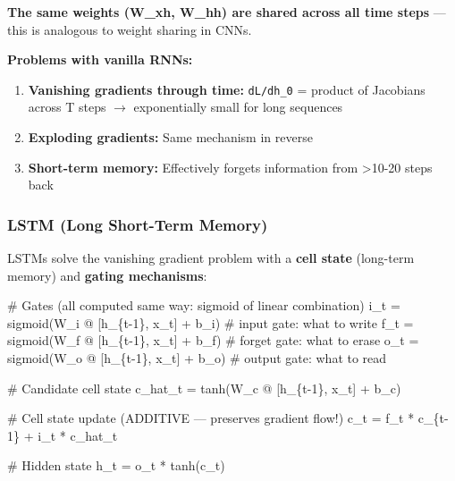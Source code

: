 \documentclass[11pt]{article}
\providecommand{\tightlist}{\setlength{\itemsep}{1pt}\setlength{\parskip}{0pt}}
\newenvironment{Shaded}{\begin{snugshade}}{\end{snugshade}}
\newcommand{\CommentTok}[1]{\textcolor[rgb]{0.48,0.49,0.49}{#1}}
\newcommand{\DecValTok}[1]{\textcolor[rgb]{0.96,0.45,0.00}{#1}}
\newcommand{\NormalTok}[1]{\textcolor[rgb]{0.81,0.81,0.76}{#1}}
\newcommand{\OperatorTok}[1]{\textcolor[rgb]{0.81,0.81,0.76}{#1}}
\begin{document}
\textbf{The same weights (W\_xh, W\_hh) are shared across all time steps} --- this is analogous to weight sharing in CNNs.

\textbf{Problems with vanilla RNNs:}

\begin{enumerate}
\def\labelenumi{\arabic{enumi}.}
\tightlist
\item
  \textbf{Vanishing gradients through time:} \texttt{dL/dh\_0} = product of Jacobians across T steps \(\rightarrow\) exponentially small for long sequences
\item
  \textbf{Exploding gradients:} Same mechanism in reverse
\item
  \textbf{Short-term memory:} Effectively forgets information from \textgreater10-20 steps back
\end{enumerate}

\subsubsection{LSTM (Long Short-Term Memory)}\label{lstm-long-short-term-memory}

LSTMs solve the vanishing gradient problem with a \textbf{cell state} (long-term memory) and \textbf{gating mechanisms}:


\begin{Shaded}
\begin{Highlighting}[]
\CommentTok{\# Gates (all computed same way: sigmoid of linear combination)}
\NormalTok{i\_t }\OperatorTok{=}\NormalTok{ sigmoid(W\_i }\OperatorTok{@}\NormalTok{ [h\_\{t}\OperatorTok{{-}}\DecValTok{1}\NormalTok{\}, x\_t] }\OperatorTok{+}\NormalTok{ b\_i)   }\CommentTok{\# input gate: what to write}
\NormalTok{f\_t }\OperatorTok{=}\NormalTok{ sigmoid(W\_f }\OperatorTok{@}\NormalTok{ [h\_\{t}\OperatorTok{{-}}\DecValTok{1}\NormalTok{\}, x\_t] }\OperatorTok{+}\NormalTok{ b\_f)   }\CommentTok{\# forget gate: what to erase}
\NormalTok{o\_t }\OperatorTok{=}\NormalTok{ sigmoid(W\_o }\OperatorTok{@}\NormalTok{ [h\_\{t}\OperatorTok{{-}}\DecValTok{1}\NormalTok{\}, x\_t] }\OperatorTok{+}\NormalTok{ b\_o)   }\CommentTok{\# output gate: what to read}

\CommentTok{\# Candidate cell state}
\NormalTok{c\_hat\_t }\OperatorTok{=}\NormalTok{ tanh(W\_c }\OperatorTok{@}\NormalTok{ [h\_\{t}\OperatorTok{{-}}\DecValTok{1}\NormalTok{\}, x\_t] }\OperatorTok{+}\NormalTok{ b\_c)}

\CommentTok{\# Cell state update (ADDITIVE — preserves gradient flow!)}
\NormalTok{c\_t }\OperatorTok{=}\NormalTok{ f\_t }\OperatorTok{*}\NormalTok{ c\_\{t}\OperatorTok{{-}}\DecValTok{1}\NormalTok{\} }\OperatorTok{+}\NormalTok{ i\_t }\OperatorTok{*}\NormalTok{ c\_hat\_t}

\CommentTok{\# Hidden state}
\NormalTok{h\_t }\OperatorTok{=}\NormalTok{ o\_t }\OperatorTok{*}\NormalTok{ tanh(c\_t)}
\end{Highlighting}
\end{Shaded}
\end{document}
